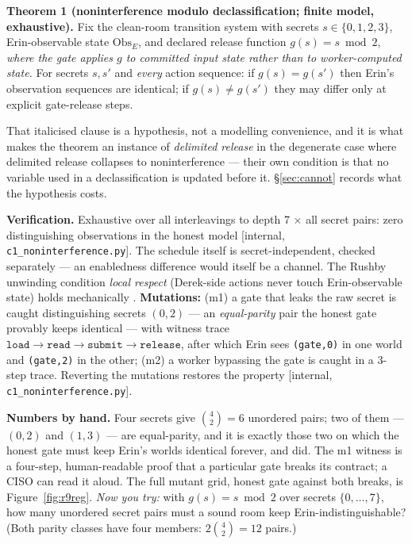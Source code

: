 \documentclass[11pt,a4paper]{article}
\begin{document}
\begin{thebox}
\textbf{Theorem 1 (noninterference modulo declassification; finite model, exhaustive).} Fix the clean-room transition system with
secrets $s\in\{0,1,2,3\}$, Erin-observable state $\mathrm{Obs}_E$, and declared release function $g(s)=s\bmod 2$, \emph{where the
gate applies $g$ to committed input state rather than to worker-computed state.} For secrets $s,s'$ and \emph{every} action
sequence: if $g(s)=g(s')$ then Erin's observation sequences are identical; if $g(s)\neq g(s')$ they may differ only at explicit
gate-release steps.

That italicised clause is a hypothesis, not a modelling convenience, and it is what makes the theorem an instance of
\emph{delimited release} \cite{sm03} in the degenerate case where delimited release collapses to noninterference --- their own
condition is that no variable used in a declassification is updated before it. \S\ref{sec:cannot} records what the hypothesis
costs.

\textbf{Verification.} Exhaustive over all interleavings to depth 7 $\times$ all secret pairs: zero distinguishing observations in
the honest model [internal, \texttt{c1\_noninterference.py}]. The schedule itself is secret-independent, checked separately --- an
enabledness difference would itself be a channel. The Rushby unwinding condition \emph{local respect} (Derek-side actions never
touch Erin-observable state) holds mechanically \cite{rushby}. \textbf{Mutations:} (m1) a gate that leaks the raw secret is caught
distinguishing secrets $(0,2)$ --- an \emph{equal-parity} pair the honest gate provably keeps identical --- with witness trace
$\mathtt{load}\to\mathtt{read}\to\mathtt{submit}\to\mathtt{release}$, after which Erin sees \texttt{(gate,0)} in one world and
\texttt{(gate,2)} in the other; (m2) a worker bypassing the gate is caught in a 3-step trace. Reverting the mutations restores the
property [internal, \texttt{c1\_noninterference.py}].
\end{thebox}

\textbf{Numbers by hand.} Four secrets give $\binom{4}{2}=6$ unordered pairs; two of them --- $(0,2)$ and $(1,3)$ --- are
equal-parity, and it is exactly those two on which the honest gate must keep Erin's worlds identical forever, and did. The m1
witness is a four-step, human-readable proof that a particular gate breaks its contract; a CISO can read it aloud. The full mutant
grid, honest gate against both breaks, is Figure~\ref{fig:r9reg}.
\emph{Now you try:} with $g(s)=s\bmod 2$ over secrets $\{0,\dots,7\}$, how many unordered secret pairs must a sound room keep
Erin-indistinguishable? (Both parity classes have four members: $2\binom{4}{2}=12$ pairs.)
\end{document}
